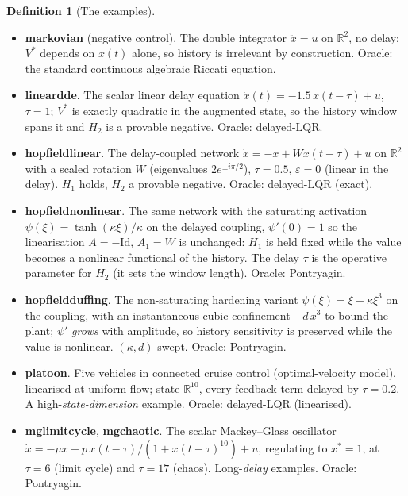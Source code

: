 \documentclass[11pt]{article}
\renewcommand{\_}{\discretionary{\textunderscore}{}{\textunderscore}}
\theoremstyle{plain}
\theoremstyle{definition}
\newtheorem{definition}[theorem]{Definition}
\newcommand{\R}{\mathbb{R}}
\begin{document}
\begin{definition}[The examples]\label{def:examples}
\leavevmode
\begin{itemize}
\item \textbf{markovian} (negative control). The double integrator $\ddot x=u$ on $\R^{2}$, no
delay; $V^{\ast}$ depends on $x(t)$ alone, so history is irrelevant by construction. Oracle:
the standard continuous algebraic Riccati equation.
\item \textbf{linear\_dde}. The scalar linear delay equation
$\dot x(t)=-1.5\,x(t-\tau)+u$, $\tau=1$; $V^{\ast}$ is exactly quadratic in the augmented
state, so the history window spans it and $H_2$ is a provable negative. Oracle: delayed-LQR.
\item \textbf{hopfield\_linear}. The delay-coupled network $\dot x=-x+Wx(t-\tau)+u$ on $\R^{2}$
with a scaled rotation $W$ (eigenvalues $2e^{\pm i\pi/2}$), $\tau=0.5$, $\varepsilon=0$
(linear in the delay). $H_1$ holds, $H_2$ a provable negative. Oracle: delayed-LQR (exact).
\item \textbf{hopfield\_nonlinear}. The same network with the saturating activation
$\psi(\xi)=\tanh(\kappa\xi)/\kappa$ on the delayed coupling, $\psi'(0)=1$ so the
linearisation $A=-\mathrm{Id},\,A_1=W$ is unchanged: $H_1$ is held fixed while the value becomes a
nonlinear functional of the history. The delay $\tau$ is the operative parameter for $H_2$ (it sets
the window length). Oracle: Pontryagin.
\item \textbf{hopfield\_duffing}. The non-saturating hardening variant
$\psi(\xi)=\xi+\kappa\xi^{3}$ on the coupling, with an instantaneous cubic confinement
$-d\,x^{3}$ to bound the plant; $\psi'$ \emph{grows} with amplitude, so history sensitivity
is preserved while the value is nonlinear. $(\kappa,d)$ swept. Oracle: Pontryagin.
\item \textbf{platoon}. Five vehicles in connected cruise control (optimal-velocity model),
linearised at uniform flow; state $\R^{10}$, every feedback term delayed by $\tau=0.2$. A
high-\emph{state-dimension} example. Oracle: delayed-LQR (linearised).
\item \textbf{mg\_limit\_cycle}, \textbf{mg\_chaotic}. The scalar Mackey--Glass oscillator
$\dot x=-\mu x+p\,x(t-\tau)/(1+x(t-\tau)^{10})+u$, regulating to $x^{\ast}=1$, at $\tau=6$
(limit cycle) and $\tau=17$ (chaos). Long-\emph{delay} examples. Oracle: Pontryagin.
\end{itemize}
\end{definition}
\end{document}
